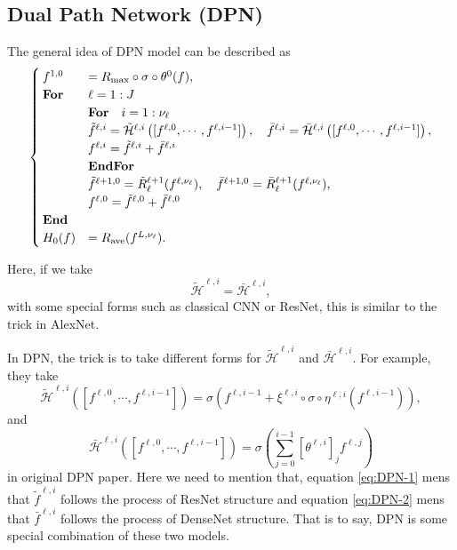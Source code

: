 \subsection{Dual Path Network (DPN)}
The general idea of DPN model \cite{chen2017dual} can be described as
\begin{equation}\label{eq:DPN}
\begin{cases}
f^{1,0} &=R_{\rm max}\circ \sigma \circ \theta^0(f), \\
\text{\bf For} &\ell = 1:J \\
\quad &\text{\bf For} \quad i = 1:\nu_\ell \\
&\tilde{f}^{\ell,i} = \tilde{\mathcal{H}}^{\ell,i} \left(  [f^{\ell,0}, \cdots, f^{\ell,i-1}]  \right), 
\quad  \bar{f}^{\ell,i} = \bar{\mathcal{H}}^{\ell,i} \left([f^{\ell,0}, \cdots, f^{\ell,i-1}] \right),\\ 
&f^{\ell,i} =  \tilde f^{\ell,i} +  \bar f^{\ell,i} \\
\quad &\text{\bf EndFor} \\
&\tilde f^{\ell+1,0} =  \tilde R_\ell^{\ell+1} ( f^{\ell, \nu_\ell} ) ,  \quad \bar f^{\ell+1,0} =  \bar R_\ell^{\ell+1} ( f^{\ell, \nu_\ell} ) ,\\
&f^{\ell,0} =  \tilde f^{\ell,0} +  \bar f^{\ell,0} \\
\text{\bf End} &\\
H_0(f) &=  R_{\rm ave}(f^{L,\nu_\ell}). \\
\end{cases}
\end{equation}

Here, if we take 
\begin{equation}
\tilde{\mathcal{H}}^{\ell,i} =  \bar{\mathcal{H}}^{\ell,i},
\end{equation}
with some special forms such as classical CNN or ResNet, this is
similar to the trick in AlexNet.

In DPN, the trick is to take different forms for $\tilde{\mathcal{H}}^{\ell,i} $ and $ \bar{\mathcal{H}}^{\ell,i}$.
For example, they take
\begin{equation}\label{eq:DPN-1}
\tilde{\mathcal{H}}^{\ell,i} \left(  [f^{\ell,0}, \cdots, f^{\ell,i-1}]  \right) = \sigma( f^{\ell,i-1} + \xi^{\ell,i} \circ \sigma \circ \eta^{\ell,i}(f^{\ell,i-1})),
\end{equation}
and 
\begin{equation}\label{eq:DPN-2}
\bar{\mathcal{H}}^{\ell,i} \left(  [f^{\ell,0}, \cdots, f^{\ell,i-1}]  \right) = \sigma \left( \sum_{j=0}^{i-1} [\theta^{\ell,i}]_{j} f^{\ell,j} \right)
\end{equation}
in original DPN paper.
Here we need to mention that, equation \eqref{eq:DPN-1} mens that $\tilde f^{\ell,i}$ follows the
process of ResNet structure and equation \eqref{eq:DPN-2} mens that $\bar f^{\ell,i}$ follows the
process of DenseNet structure. That is to say, DPN is some special combination of these two models.

